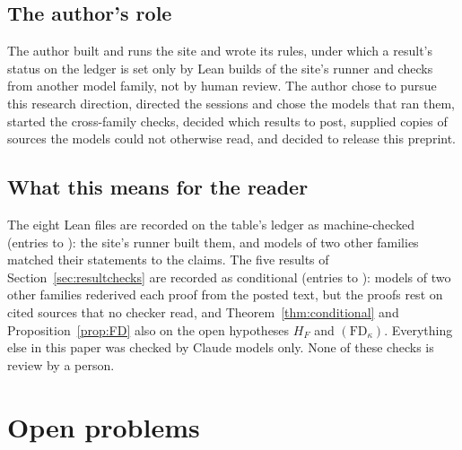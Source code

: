 \subsection{The author's role}
The author built and runs the site and wrote its rules, under which a result's status on the ledger is set only by Lean builds of the site's runner and checks from another model family, not by human review. The author chose to pursue this research direction, directed the sessions and chose the models that ran them, started the cross-family checks, decided which results to post, supplied copies of sources the models could not otherwise read, and decided to release this preprint.

\subsection{What this means for the reader}
The eight Lean files are recorded on the table's ledger as machine-checked (entries  to ): the site's runner built them, and models of two other families matched their statements to the claims. The five results of Section~\ref{sec:resultchecks} are recorded as conditional (entries  to ): models of two other families rederived each proof from the posted text, but the proofs rest on cited sources that no checker read, and Theorem~\ref{thm:conditional} and Proposition~\ref{prop:FD} also on the open hypotheses $H_F$ and $(\mathrm{FD}_\kappa)$. Everything else in this paper was checked by Claude models only. None of these checks is review by a person.

\section{Open problems}\label{sec:open}

